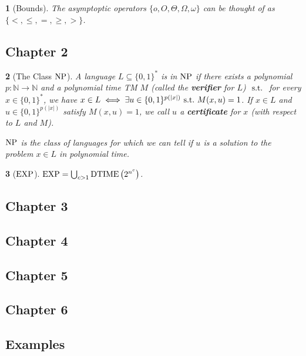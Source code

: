 \documentclass[10pt]{article}
\newtheorem{note}{}[section]
\begin{document}
\begin{note}[Bounds]
  The asymptoptic operators $\{o, O, \Theta, \Omega, \omega\}$ can be thought
  of as $\{ <, \leq, =, \geq, > \}$.
\end{note}

\subsection*{Chapter 2}
\begin{note}[The Class $\mathrm{NP}$]
  A language $L \subseteq \{0, 1\}^\ast$ is in $\mathrm{NP}$ if there exists a
  polynomial $p : \mathbb{N} \to \mathbb{N}$ and a polynomial time TM $M$
  (called the \textbf{verifier} for $L$) $\mathrm{\ s.t.\ }$ for every
  $x \in \{0, 1\}^\ast$, we have
  $x \in L \iff \exists u \in \{0, 1\}^{p(|x|)} \mathrm{\ s.t.\ } M(x, u) = 1$.
  If $x \in L$ and $u \in \{0, 1\}^{p(|x|)}$ satisfy $M(x, u) = 1$,
  we call $u$ a \textbf{certificate} for $x$ (with respect to $L$ and $M$).
 
  $\mathrm{NP}$ is the class of languages for which we can tell if
  $u$ is a solution to the problem $x \in L$ in polynomial time.
\end{note}

\begin{note}[$\mathrm{EXP}$]
  $\mathrm{EXP} = \bigcup_{c > 1} \mathrm{DTIME}\left(2^{n^c}\right)$.
\end{note}

\subsection*{Chapter 3}



\subsection*{Chapter 4}


\subsection*{Chapter 5}



\subsection*{Chapter 6}


\subsection*{Examples}
\end{document}
